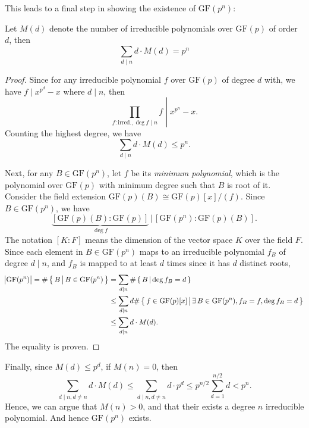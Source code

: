 This leads to a final step in showing the existence of $\mathrm{GF}(p^n)$:
\begin{theorem}
    Let $M(d)$ denote the number of irreducible polynomials over $\mathrm{GF}(p)$ of order $d$, then
    \begin{equation}
        \sum_{d\mid n} d \cdot M(d) = p^n
    \end{equation}
\end{theorem}
\begin{proof}
    Since for any irreducible polynomial $f$ over $\mathrm{GF}(p)$ of degree $d$ with, we have $f\mid x^{p^d}-x$ where $d\mid n$, then
    \begin{equation}
        \left.\prod_{f:\text{irred.}, \deg f\mid n} f \;\right\vert\; x^{p^n}-x.
    \end{equation}
    Counting the highest degree, we have
    \begin{equation*}
        \sum_{d\mid n} d \cdot M(d) \le p^n.
    \end{equation*}
    
    Next, for any $B\in\mathrm{GF}(p^n)$, let $f$ be its \textit{minimum polynomial}, which is the polynomial over $\mathrm{GF}(p)$ with minimum degree such that $B$ is root of it. Consider the field extension $\mathrm{GF}(p)(B)\cong\mathrm{GF}(p)[x]/(f)$. Since $B\in\mathrm{GF}(p^n)$, we have
    \begin{equation*}
        \underbrace{[\mathrm{GF}(p)(B):\mathrm{GF}(p)]}_{\deg f} \,\Big|\, [\mathrm{GF}(p^n):\mathrm{GF}(p)(B)].
    \end{equation*}
    The notation $[K:F]$ means the dimension of the vector space $K$ over the field $F$. Since each element in $B\in\mathrm{GF}(p^n)$ maps to an irreducible polynomial $f_B$ of degree $d\mid n$, and $f_B$ is mapped to at least $d$ times since it has $d$ distinct roots,
    \begin{align*}
        \abs{\mathrm{GF}(p^n)} = \#\left\{\,{B}\,\middle\vert\,{B\in\mathrm{GF}(p^n)}\,\right\} &= \sum_{d\mid n} \#\left\{\,{B}\,\middle\vert\,{\deg f_B=d}\,\right\} \\
        &\le \sum_{d\mid n} d \#\left\{\,{f\in\mathrm{GF}(p)[x]}\,\middle\vert\,{\exists\,B\in\mathrm{GF}(p^n), f_B = f, \deg f_B = d}\,\right\} \\
        &\le \sum_{d\mid n} d\cdot M(d).
    \end{align*}
    The equality is proven.
\end{proof}

Finally, since $M(d)\le p^d$, if $M(n)=0$, then
\begin{equation*}
    \sum_{d\mid n, d\neq n} d\cdot M(d) \le \sum_{d\mid n, d\neq n} d\cdot p^d \le p^{n/2} \sum_{d=1}^{n/2}d < p^n.
\end{equation*}
Hence, we can argue that $M(n)>0$, and that their exists a degree $n$ irreducible polynomial. And hence $\mathrm{GF}(p^n)$ exists.

